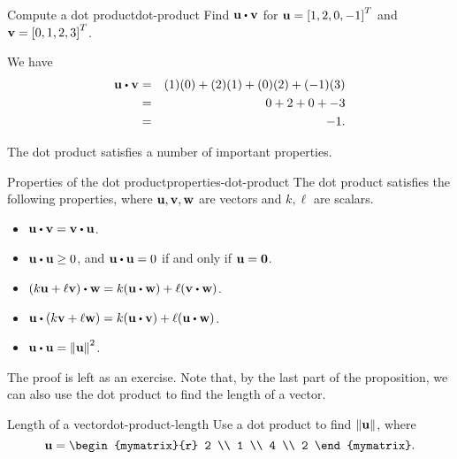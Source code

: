\begin{example}{Compute a dot product}{dot-product}
  Find $\vect{u} \dotprod \vect{v}$ for $\vect{u}=\mat{1,2,0,-1}^T$
  and $\vect{v}=\mat{0,1,2,3}^T$.
\end{example}

\begin{solution}
  We have
  \begin{eqnarray*}
    \vect{u} \dotprod \vect{v}
    &=&
        (1)(0) + (2)(1) + (0)(2) + (-1)(3) \\
    &=&
        0 + 2 + 0 + -3 \\
    &=&
        -1.
  \end{eqnarray*}
\end{solution}

The dot product satisfies a number of important properties.

\begin{proposition}{Properties of the dot product}{properties-dot-product}
  The dot product satisfies the following properties, where
  $\vect{u},\vect{v},\vect{w}$ are vectors and $k,\ell$ are
  scalars.
  \begin{itemize}
  \item $\vect{u}\dotprod\vect{v}=\vect{v}\dotprod\vect{u}$.
  \item $\vect{u}\dotprod\vect{u}\geq 0$, and $\vect{u}\dotprod\vect{u}=0$ if and only if $\vect{u}=\vect{0}$.
  \item $(k\vect{u}+\ell\vect{v})\dotprod\vect{w}=k(\vect{u}\dotprod\vect{w})+\ell(\vect{v}\dotprod\vect{w})$.
  \item $\vect{u}\dotprod(k\vect{v}+\ell\vect{w})
    =k(\vect{u}\dotprod \vect{v})+\ell(\vect{u}\dotprod\vect{w})$.
  \item $\vect{u}\dotprod\vect{u}=\norm{\vect{u}}^{2}$.
  \end{itemize}
\end{proposition}

The proof is left as an exercise. Note that, by the last part of the
proposition, we can also use the dot product to find the length of a
vector.

\begin{example}{Length of a vector}{dot-product-length}
  Use a dot product to find $\norm{\vect{u}}$, where
  \begin{equation*}
    \vect{u}
    =
    \begin{mymatrix}{r}
      2 \\
      1 \\
      4 \\
      2
    \end{mymatrix}.
  \end{equation*}
\end{example}

